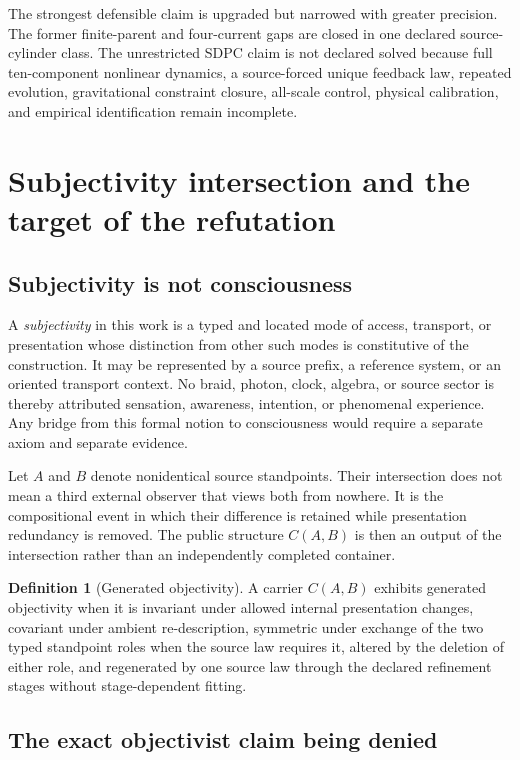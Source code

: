 \documentclass[11pt]{article}
\theoremstyle{definition}
\newtheorem{definition}[theorem]{Definition}
\theoremstyle{remark}
\begin{document}
The strongest defensible claim is upgraded but narrowed with greater precision. The former finite-parent and four-current gaps are closed in one declared source-cylinder class. The unrestricted SDPC claim is not declared solved because full ten-component nonlinear dynamics, a source-forced unique feedback law, repeated evolution, gravitational constraint closure, all-scale control, physical calibration, and empirical identification remain incomplete.

\section{Subjectivity intersection and the target of the refutation}

\subsection{Subjectivity is not consciousness}

A \emph{subjectivity} in this work is a typed and located mode of access, transport, or presentation whose distinction from other such modes is constitutive of the construction. It may be represented by a source prefix, a reference system, or an oriented transport context. No braid, photon, clock, algebra, or source sector is thereby attributed sensation, awareness, intention, or phenomenal experience. Any bridge from this formal notion to consciousness would require a separate axiom and separate evidence.

Let $A$ and $B$ denote nonidentical source standpoints. Their intersection does not mean a third external observer that views both from nowhere. It is the compositional event in which their difference is retained while presentation redundancy is removed. The public structure $C(A,B)$ is then an output of the intersection rather than an independently completed container.

\begin{definition}[Generated objectivity]
A carrier $C(A,B)$ exhibits generated objectivity when it is invariant under allowed internal presentation changes, covariant under ambient re-description, symmetric under exchange of the two typed standpoint roles when the source law requires it, altered by the deletion of either role, and regenerated by one source law through the declared refinement stages without stage-dependent fitting.
\end{definition}

\subsection{The exact objectivist claim being denied}
\end{document}

